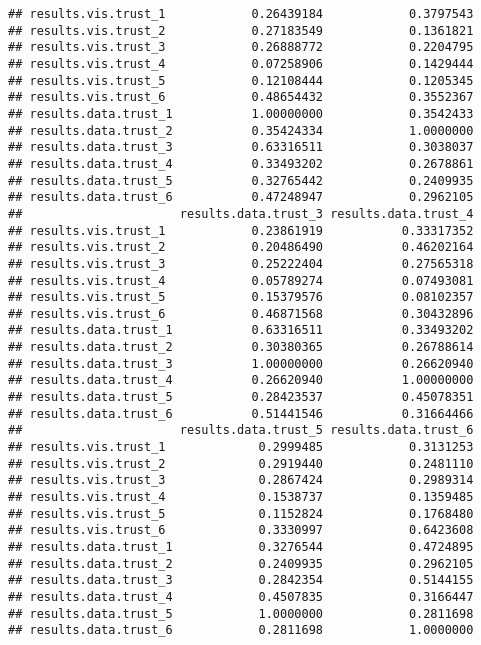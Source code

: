 \documentclass[
]{article}
\begin{document}
\begin{verbatim}
## results.vis.trust_1            0.26439184            0.3797543
## results.vis.trust_2            0.27183549            0.1361821
## results.vis.trust_3            0.26888772            0.2204795
## results.vis.trust_4            0.07258906            0.1429444
## results.vis.trust_5            0.12108444            0.1205345
## results.vis.trust_6            0.48654432            0.3552367
## results.data.trust_1           1.00000000            0.3542433
## results.data.trust_2           0.35424334            1.0000000
## results.data.trust_3           0.63316511            0.3038037
## results.data.trust_4           0.33493202            0.2678861
## results.data.trust_5           0.32765442            0.2409935
## results.data.trust_6           0.47248947            0.2962105
##                      results.data.trust_3 results.data.trust_4
## results.vis.trust_1            0.23861919           0.33317352
## results.vis.trust_2            0.20486490           0.46202164
## results.vis.trust_3            0.25222404           0.27565318
## results.vis.trust_4            0.05789274           0.07493081
## results.vis.trust_5            0.15379576           0.08102357
## results.vis.trust_6            0.46871568           0.30432896
## results.data.trust_1           0.63316511           0.33493202
## results.data.trust_2           0.30380365           0.26788614
## results.data.trust_3           1.00000000           0.26620940
## results.data.trust_4           0.26620940           1.00000000
## results.data.trust_5           0.28423537           0.45078351
## results.data.trust_6           0.51441546           0.31664466
##                      results.data.trust_5 results.data.trust_6
## results.vis.trust_1             0.2999485            0.3131253
## results.vis.trust_2             0.2919440            0.2481110
## results.vis.trust_3             0.2867424            0.2989314
## results.vis.trust_4             0.1538737            0.1359485
## results.vis.trust_5             0.1152824            0.1768480
## results.vis.trust_6             0.3330997            0.6423608
## results.data.trust_1            0.3276544            0.4724895
## results.data.trust_2            0.2409935            0.2962105
## results.data.trust_3            0.2842354            0.5144155
## results.data.trust_4            0.4507835            0.3166447
## results.data.trust_5            1.0000000            0.2811698
## results.data.trust_6            0.2811698            1.0000000
\end{verbatim}
\end{document}

